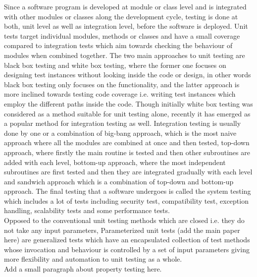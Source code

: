 Since a software program is developed at module or class level and is integrated with other modules or classes along the development cycle, testing is done at both, unit level as well as integration level, before the software is deployed. Unit tests target individual modules, methods or classes and have a small coverage compared to integration tests which aim towards checking the behaviour of modules when combined together. The two main approaches to unit testing are black box testing and white box testing, where the former one focuses on designing test instances without looking inside the code or design, in other words black box testing only focuses on the functionality, and the latter approach is more inclined towards testing code coverage i.e. writing test instances which employ the different paths inside the code. Though initially white box testing was considered as a method suitable for unit testing alone, recently it has emerged as a popular method for integration testing as well. Integration testing is usually done by one or a combination of big-bang approach, which is the most naive approach where all the modules are combined at once and then tested, top-down approach, where firstly the main routine is tested and then other subroutines are added with each level, bottom-up approach, where the most independent subroutines are first tested and then they are integrated gradually with each level and sandwich approach which is a combination of top-down and bottom-up approach. The final testing that a software undergoes is called the system testing which includes a lot of tests including security test, compatibility test, exception handling, scalability tests and some performance tests. \\

Opposed to the conventional unit testing methods which are closed i.e. they do not take any input parameters, Parameterized unit tests (add the main paper here) %
are generalized tests which have an encapsulated collection of test methods whose invocation and behaviour is controlled by a set of input parameters giving more flexibility and automation to unit testing as a whole. \\

Add a small paragraph about property testing here.